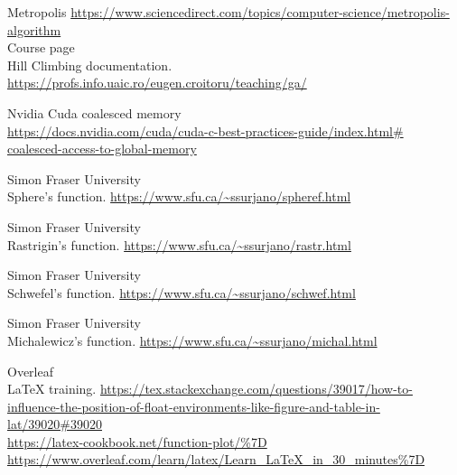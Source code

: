 \documentclass{article}
\begin{document}
\begin{thebibliography}{9}

    Metropolis \url{https://www.sciencedirect.com/topics/computer-science/metropolis-algorithm} \\  
  
  Course page \\ Hill Climbing documentation.
  \url{https://profs.info.uaic.ro/eugen.croitoru/teaching/ga/}

  Nvidia Cuda coalesced memory \\
  \url{https://docs.nvidia.com/cuda/cuda-c-best-practices-guide/index.html\# coalesced-access-to-global-memory}

  Simon Fraser University \\ Sphere's function.
  \url{https://www.sfu.ca/~ssurjano/spheref.html}

  Simon Fraser University \\  Rastrigin's function.
  \url{https://www.sfu.ca/~ssurjano/rastr.html}

  Simon Fraser University \\ Schwefel's function.
  \url{https://www.sfu.ca/~ssurjano/schwef.html}

  Simon Fraser University \\ Michalewicz's function.
  \url{https://www.sfu.ca/~ssurjano/michal.html}

  Overleaf \\ LaTeX training.
  \url{https://tex.stackexchange.com/questions/39017/how-to-influence-the-position-of-float-environments-like-figure-and-table-in-lat/39020#39020} \\
  \url{https://latex-cookbook.net/function-plot/%7D} \\  
  \url{https://www.overleaf.com/learn/latex/Learn_LaTeX_in_30_minutes%7D}

\end{thebibliography}  
\end{document}
